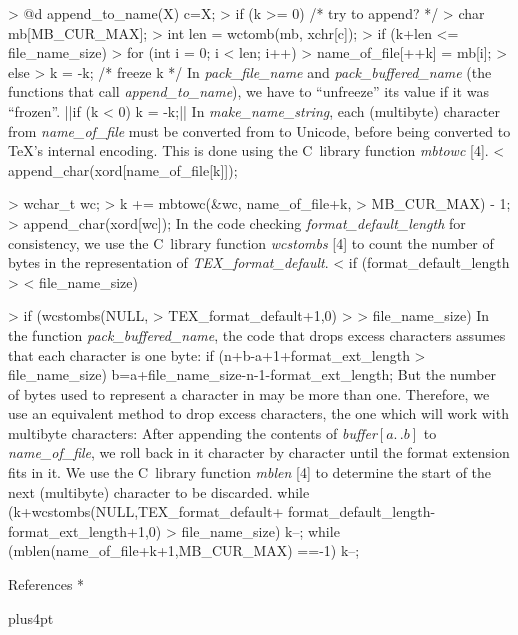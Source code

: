 > @d append_to_name(X) { c=X;
>   if (k >= 0) { /* try to append? */
>     char mb[MB_CUR_MAX];
>     int len = wctomb(mb, xchr[c]);
>     if (k+len <= file_name_size)
>       for (int i = 0; i < len; i++)
>         name_of_file[++k] = mb[i];
>     else
>       k = -k; /* freeze k */ } }
\endverbatim
\medskip
In {\it pack\_file\_name\/} and {\it pack\_buffered\_name\/}
(the functions that call {\it append\_to\_name\/}),
we have to ``unfreeze'' its value
if it was ``frozen''.
||if (k < 0) k = -k;||
\medskip
In {\it make\_name\_string},
each (multibyte) character from {\it name\_of\_file\/}
must be converted from  to Unicode,
before being converted to \TeX's internal encoding.
This is done using the C~library function
{\it mbtowc\/} [4].
\verbatim
< append_char(xord[name_of_file[k]]);

> { wchar_t wc;
>   k += mbtowc(&wc, name_of_file+k,
>               MB_CUR_MAX) - 1;
>   append_char(xord[wc]); }
\endverbatim
\medskip
In the code checking {\it format\_default\_length\/}
for consistency, we
use the C~library function {\it wcstombs\/} [4] to count
the number of bytes in the  representation of
{\it TEX\_format\_default\/}.
\verbatim
< if (format_default_length >
<     file_name_size)

> if (wcstombs(NULL,
>     TEX_format_default+1,0) >
>     file_name_size)
\endverbatim
\medskip
In the function {\it pack\_buffered\_name\/},
the code that drops excess characters
assumes that each character is one byte:
\verbatim
if (n+b-a+1+format_ext_length >
    file_name_size)
  b=a+file_name_size-n-1-format_ext_length;
\endverbatim
But the number of bytes used to represent
a character in \hbox{} may be more than one.
Therefore, we use an equivalent method to drop excess
characters, the one which will work with multibyte characters:
After appending
the contents of
{\it buffer\/$[a\mathrel{.\,.}b]$\/}
to {\it name\_of\_file\/}, we roll back in it
character by character until the
format extension fits in it. We use the C~library
function {\it mblen\/} [4] to determine
the start of the next (multibyte) character to be discarded.
\verbatim
while (k+wcstombs(NULL,TEX_format_default+
       format_default_length-
       format_ext_length+1,0) >
       file_name_size) {
  k--;
  while (mblen(name_of_file+k+1,MB_CUR_MAX)
         ==-1)
    k--;
}
\endverbatim

\head * References *

\begingroup
\vskip-1pt

\frenchspacing
\parindent=0pt
\parskip=4pt plus4pt
\def\\{\hfil\break}
\everypar{\hangindent=1.5em\relax}
\raggedright

